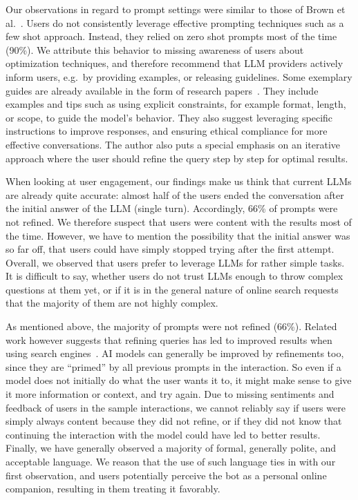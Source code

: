 Our observations in regard to prompt settings were similar to those of Brown et al.~\cite{brown_language_2020}.
Users do not consistently leverage effective prompting techniques such as a few shot approach.
Instead, they relied on zero shot prompts most of the time (90\%).
We attribute this behavior to missing awareness of users about optimization techniques, and
therefore recommend that LLM providers actively inform users, e.g.\ by
providing examples, or releasing guidelines.
Some exemplary guides are already available in the form of research papers~\cite{ekin_prompt_2023}.
They include examples and tips such as using explicit constraints, for example format, length, or
scope, to guide the model's behavior.
They also suggest leveraging specific instructions to improve responses, and ensuring ethical
compliance for more effective conversations.
The author also puts a special emphasis on an iterative approach where the user should refine the
query step by step for optimal results.

When looking at user engagement, our findings make us think that current LLMs are already
quite accurate: almost half of the users ended the conversation after the initial answer of
the LLM (single turn).
Accordingly, 66\% of prompts were not refined.
We therefore suspect that users were content with the results most of the time.
However, we have to mention the possibility that the initial answer was so far off,
that users could have simply stopped trying after the first attempt.
Overall, we observed that users prefer to leverage LLMs for rather simple tasks.
It is difficult to say, whether users do not trust LLMs enough to throw complex questions at
them yet, or if it is in the general nature of online search requests that the majority of
them are not highly complex.

As mentioned above, the majority of prompts were not refined (66\%).
Related work however suggests that refining queries has led to improved results when using search
engines~\cite{huang_analyzing_2009}.
AI models can generally be improved by refinements too, since they are “primed” by all previous
prompts in the interaction.
So even if a model does not initially do what the user wants it to, it might make
sense to give it more information or context, and try again.
Due to missing sentiments and feedback of users in the sample interactions, we cannot reliably say
if users were simply always content because they did not refine, or if they did not know that
continuing the interaction with the model could have led to better results.
Finally, we have generally observed a majority of formal, generally polite, and acceptable language.
We reason that the use of such language ties in with our first observation, and users potentially
perceive the bot as a personal online companion, resulting in them treating it favorably.

